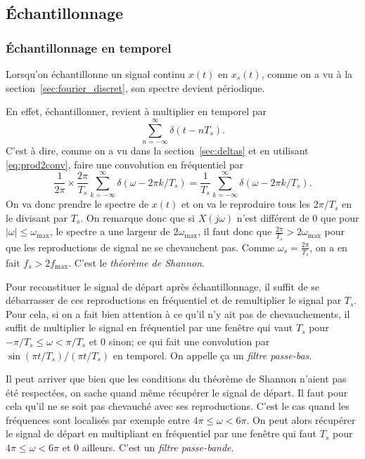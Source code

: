 \subsection{Échantillonnage}
\label{sec:sampling}
\subsubsection{Échantillonnage en temporel}
Lorsqu'on échantillonne un signal continu $x(t)$ en $x_s(t)$,
comme on a vu à la section~\ref{sec:fourier_discret},
son spectre devient périodique.

En effet, échantillonner,
revient à multiplier en temporel par
\[ \sum_{n=-\infty}^{\infty} \delta(t-nT_s). \]
C'est à dire, comme on a vu dans la section~\ref{sec:deltas} et
en utilisant \eqref{eq:prod2conv},
faire une convolution en fréquentiel par
\[ \frac{1}{2\pi} \times
\frac{2\pi}{T_s}\sum_{k=-\infty}^\infty\delta(\omega-2\pi k/T_s)
= \frac{1}{T_s}\sum_{k=-\infty}^\infty\delta(\omega-2\pi k/T_s). \]
On va donc prendre le spectre de $x(t)$ et on va le reproduire tous les
$2\pi/T_s$ en le divisant par $T_s$.
On remarque donc que si $X(j\omega)$ n'est différent de 0 que pour
$|\omega| \leq \omega_\mathrm{max}$,
le spectre a une largeur de $2\omega_\mathrm{max}$,
il faut donc que $\frac{2\pi}{T_s} > 2\omega_\mathrm{max}$ pour que les
reproductions de signal ne se chevauchent pas.
Comme $\omega_s = \frac{2\pi}{T_s}$, on a en fait $f_s > 2f_\mathrm{max}$.
C'est le \emph{théorème de Shannon}.

Pour reconstituer le signal de départ après échantillonnage,
il suffit de se débarrasser de ces reproductions en fréquentiel
et de remultiplier le signal par $T_s$.
Pour cela, si on a fait bien attention à
ce qu'il n'y ait pas de chevauchements,
il suffit de multiplier le signal en fréquentiel par une fenêtre
qui vaut $T_s$ pour $-\pi/T_s \leq \omega < \pi/T_s$ et 0 sinon;
ce qui fait une convolution par $\sin(\pi t/T_s)/(\pi t/T_s)$ en temporel.
On appelle ça un \emph{filtre passe-bas}.

Il peut arriver que bien que les conditions du théorème de Shannon n'aient
pas été respectées, on sache quand même récupérer le signal de départ.
Il faut pour cela qu'il ne se soit pas chevauché avec ses reproductions.
C'est le cas quand les fréquences sont localisés par exemple entre
$4\pi \leq \omega < 6\pi$.
On peut alors récupérer le signal de départ en multipliant
en fréquentiel par une fenêtre qui faut $T_s$ pour
$4\pi \leq \omega < 6\pi$ et 0 ailleurs.
C'est un \emph{filtre passe-bande}.

